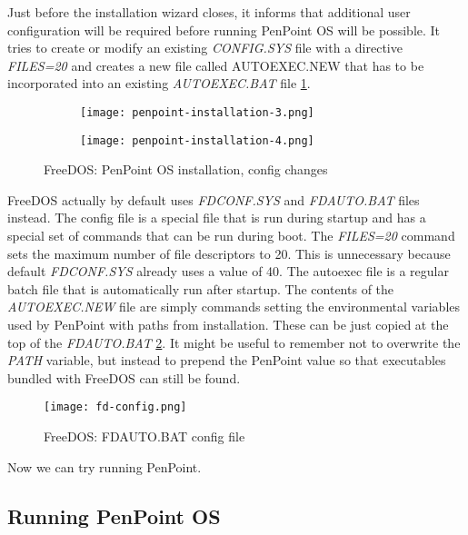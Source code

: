 Just before the installation wizard closes, it informs that additional user
configuration will be required before running PenPoint OS will be possible. It
tries to create or modify an existing \emph{CONFIG.SYS} file with a directive
\emph{FILES=20} and creates a new file called AUTOEXEC.NEW that has to be
incorporated into an existing \emph{AUTOEXEC.BAT} file
\ref{fig:penpoint-installation-2}.

\begin{figure}[H]
    \centering
    \begin{subfigure}[b]{0.45\linewidth}
        \texttt{[image: penpoint-installation-3.png]}
    \end{subfigure}
    \hfill
    \begin{subfigure}[b]{0.45\linewidth}
        \texttt{[image: penpoint-installation-4.png]}
    \end{subfigure}
    \caption{FreeDOS: PenPoint OS installation, config changes}
    \label{fig:penpoint-installation-2}
\end{figure}

FreeDOS actually by default uses \emph{FDCONF.SYS} and \emph{FDAUTO.BAT} files
instead. The config file is a special file that is run during startup and has
a special set of commands that can be run during boot. The \emph{FILES=20}
command sets the maximum number of file descriptors to 20. This is unnecessary
because default \emph{FDCONF.SYS} already uses a value of 40. The autoexec file
is a regular batch file that is automatically run after startup. The contents
of the \emph{AUTOEXEC.NEW} file are simply commands setting the environmental
variables used by PenPoint with paths from installation. These can be just
copied at the top of the \emph{FDAUTO.BAT} \ref{fig:fd-config}. It might be
useful to remember not to overwrite the \emph{PATH} variable, but instead to
prepend the PenPoint value so that executables bundled with FreeDOS can still
be found.

\begin{figure}[H]
    \centering
    \texttt{[image: fd-config.png]}
    \caption{FreeDOS: FDAUTO.BAT config file}
    \label{fig:fd-config}
\end{figure}

Now we can try running PenPoint.

\subsection{Running PenPoint OS}

